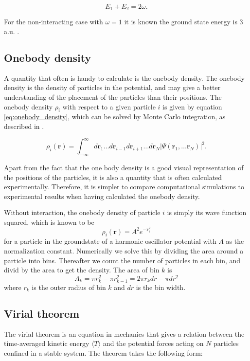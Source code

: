 \documentclass[norsk,a4paper,12pt]{article}
\begin{document}
\begin{equation}
\label{eq:HO_energy_2omega}
	E_1 + E_2 = 2\omega.
\end{equation} 

For the non-interacting case with $\omega=1$ it is known the ground state energy is 3 a.u. \cite{Taut}. 

\subsection{Onebody density} \label{sec:onebody}
A quantity that often is handy to calculate is the onebody density. The onebody density is the density of particles in the potential, and may give a better understanding of the placement of the particles than their positions. The onebody density $\rho_i$ with respect to a given particle $i$ is given by equation \ref{eq:onebody_density}, which can be solved by Monte Carlo integration, as described in \cite{Nordhagen}.    

\begin{equation}
\label{eq:onebody_density}
\rho_i(\boldsymbol{r})=\int_{-\infty}^{\infty}d\boldsymbol{r}_1\hdots d\boldsymbol{r}_{i-1}d\boldsymbol{r}_{i+1}\hdots d\boldsymbol{r}_N |\Psi(\boldsymbol{r}_1,\hdots \boldsymbol{r}_N)|^2.
\end{equation}

Apart from the fact that the one body density is a good visual representation of the positions of the particles, it is also a quantity that is often calculated experimentally. Therefore, it is simpler to compare computational simulations to  experimental results when having calculated the onebody density.

Without interaction, the onebody density of particle $i$ is simply its wave function squared, which is known to be
\begin{equation}
\rho_i(\boldsymbol{r})=A^2e^{-\boldsymbol{r}_i^2}
\end{equation}
for a particle in the groundstate of a harmonic oscillator potential with $A$ as the normalization constant. Numerically we solve this by dividing the area around a particle into bins. Thereafter we count the number of particles in each bin, and divid by the area to get the density. The area of bin $k$ is
\begin{equation}
A_k=\pi r_k^2-\pi r_{k-1}^2=2\pi r_kdr-\pi dr^2
\end{equation}
where $r_k$ is the outer radius of bin $k$ and $dr$ is the bin width.

\subsection{Virial theorem} \label{sec:Virial_theorem}
The virial theorem is an equation in mechanics that gives a relation between the time-averaged kinetic energy $\langle T \rangle$ and the potential forces acting on $N$ particles confined in a stable system. The theorem takes the following form:
\end{document}
